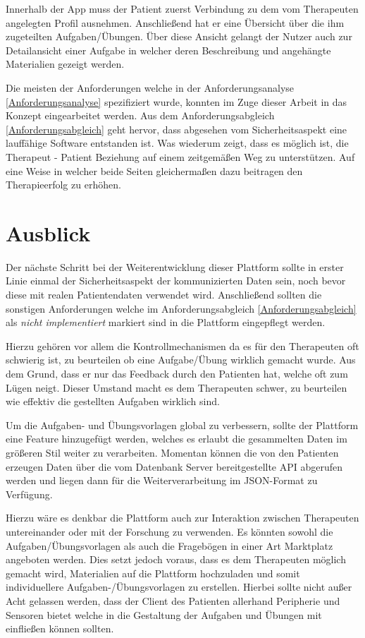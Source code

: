 Innerhalb der App muss der Patient zuerst Verbindung zu dem vom Therapeuten angelegten Profil ausnehmen. Anschließend hat er eine Übersicht über die ihm zugeteilten Aufgaben/Übungen. Über diese Ansicht gelangt der Nutzer auch zur Detailansicht einer Aufgabe in welcher deren Beschreibung und angehängte Materialien gezeigt werden.

Die meisten der Anforderungen welche in der Anforderungsanalyse \ref{Anforderungsanalyse} spezifiziert wurde, konnten im Zuge dieser Arbeit in das Konzept eingearbeitet werden. Aus dem Anforderungsabgleich \ref{Anforderungsabgleich} geht hervor, dass abgesehen vom Sicherheitsaspekt eine lauffähige Software entstanden ist. Was wiederum zeigt, dass es möglich ist, die Therapeut - Patient Beziehung auf einem zeitgemäßen Weg zu unterstützen. Auf eine Weise in welcher beide Seiten gleichermaßen dazu beitragen den Therapieerfolg zu erhöhen.  

\section{Ausblick}
Der nächste Schritt bei der Weiterentwicklung dieser Plattform sollte in erster Linie einmal der Sicherheitsaspekt der kommunizierten Daten sein, noch bevor diese mit realen Patientendaten verwendet wird. Anschließend sollten die sonstigen Anforderungen welche im Anforderungsabgleich \ref{Anforderungsabgleich} als \textit{nicht implementiert} markiert sind in die Plattform eingepflegt werden.

Hierzu gehören vor allem die Kontrollmechanismen da es für den Therapeuten oft schwierig ist, zu beurteilen ob eine Aufgabe/Übung wirklich gemacht wurde. Aus dem Grund, dass er nur das Feedback durch den Patienten hat, welche oft zum Lügen neigt. Dieser Umstand macht es dem Therapeuten schwer, zu beurteilen wie effektiv die gestellten Aufgaben wirklich sind. 

Um die Aufgaben- und Übungsvorlagen global zu verbessern, sollte der Plattform eine Feature hinzugefügt werden, welches es erlaubt die gesammelten Daten im größeren Stil weiter zu verarbeiten. Momentan können die von den Patienten erzeugen Daten über die vom Datenbank Server bereitgestellte API abgerufen werden und liegen dann für die Weiterverarbeitung im JSON-Format zu Verfügung.

Hierzu wäre es denkbar die Plattform auch zur Interaktion zwischen Therapeuten untereinander oder mit der Forschung zu verwenden. Es könnten sowohl die Aufgaben/Übungsvorlagen als auch die Fragebögen in einer Art Marktplatz angeboten werden. Dies setzt jedoch voraus, dass es dem Therapeuten möglich gemacht wird, Materialien auf die Plattform hochzuladen und somit individuellere Aufgaben-/Übungsvorlagen zu erstellen. Hierbei sollte nicht außer Acht gelassen werden, dass der Client des Patienten allerhand Peripherie und Sensoren bietet welche in die Gestaltung der Aufgaben und Übungen mit einfließen können sollten.  

